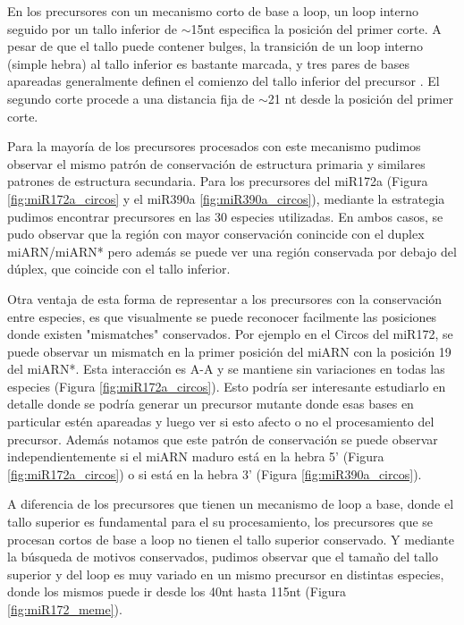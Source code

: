 En los precursores con un mecanismo corto de base a loop, un loop interno seguido por un tallo inferior de $\sim$15nt especifica la posición del primer corte.
A pesar de que el tallo puede contener bulges, la transición de un loop interno (simple hebra) al tallo inferior es bastante marcada, y tres pares de bases apareadas generalmente definen el comienzo del tallo inferior del precursor \citep{Mateos2010,Bologna2013}.
El segundo corte procede a una distancia fija de $\sim$21 nt desde la posición del primer corte.

Para la mayoría de los precursores procesados con este mecanismo pudimos observar el mismo patrón de conservación de estructura primaria y similares patrones de estructura secundaria.
Para los precursores del miR172a (Figura \ref{fig:miR172a_circos} y el miR390a \ref{fig:miR390a_circos}), mediante la estrategia pudimos encontrar precursores en las 30 especies utilizadas.
En ambos casos, se pudo observar que la región con mayor conservación conincide con el duplex miARN/miARN* pero además se puede ver una región conservada por debajo del dúplex, que coincide con el tallo inferior.

Otra ventaja de esta forma de representar a los precursores con la conservación entre especies, es que visualmente se puede reconocer facilmente las posiciones donde existen "mismatches" conservados. 
Por ejemplo en el Circos del miR172, se puede observar un mismatch en la primer posición del miARN con la posición 19 del miARN*.
Esta interacción es A-A y se mantiene sin variaciones en todas las especies (Figura \ref{fig:miR172a_circos}).
Esto podría ser interesante estudiarlo en detalle donde se podría generar un precursor mutante donde esas bases en particular estén apareadas y luego ver si esto afecto o no el procesamiento del precursor.  
Además notamos que este patrón de conservación se puede observar independientemente si el miARN maduro está en la hebra 5' (Figura \ref{fig:miR172a_circos}) o si está en la hebra 3' (Figura \ref{fig:miR390a_circos}).

A diferencia de los precursores que tienen un mecanismo de loop a base, donde el tallo superior es fundamental para el su procesamiento, los precursores que se procesan cortos de base a loop no tienen el tallo superior conservado.
Y mediante la búsqueda de motivos conservados, pudimos observar que el tamaño del tallo superior y del loop es muy variado en un mismo precursor en distintas especies, donde los mismos puede ir desde los 40nt hasta 115nt (Figura \ref{fig:miR172_meme}).


